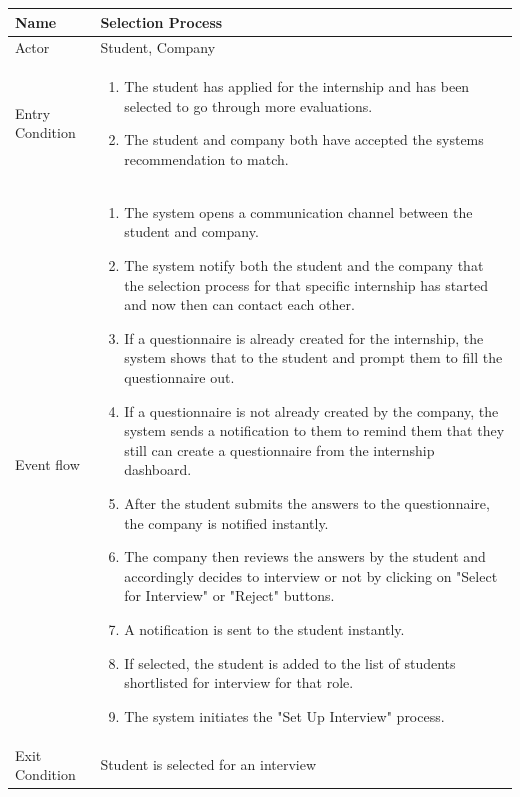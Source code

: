 \begin{table}[H]
    \centering
    \begin{tabular}{|l|p{12cm}|}
    \hline
    Name             & Selection Process \\ \hline
    Actor            & Student, Company \\ \hline
    Entry Condition  & 
    \begin{enumerate}
        \item The student has applied for the internship and has been selected to go through more evaluations.
        \item The student and company both have accepted the systems recommendation to match.
    \end{enumerate} \\ \hline
    Event flow       & 
    \begin{enumerate}
        \item The system opens a communication channel between the student and company.
        \item The system notify both the student and the company that the selection process for that specific internship has started and now then can contact each other. 
        \item If a questionnaire is already created for the internship, the system shows that to the student and prompt them to fill the questionnaire out.
        \item If a questionnaire is not already created by the company, the system sends a notification to them to remind them that they still can create a questionnaire from the internship dashboard.
        \item After the student submits the answers to the questionnaire, the company is notified instantly. 
        \item The company then reviews the answers by the student and accordingly decides to interview or not by clicking on "Select for Interview" or "Reject" buttons.
        \item A notification is sent to the student instantly.
        \item If selected, the student is added to the list of students shortlisted for interview for that role.
        \item The system initiates the "Set Up Interview" process. 
    \end{enumerate} \\ \hline
    Exit Condition   & Student is selected for an interview \\ \hline

\end{tabular}
\end{table}
